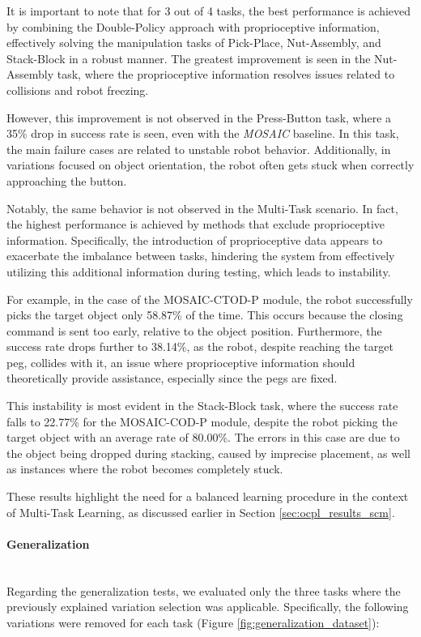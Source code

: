 It is important to note that for 3 out of 4 tasks, the best performance is achieved by combining the Double-Policy approach with proprioceptive information, effectively solving the manipulation tasks of Pick-Place, Nut-Assembly, and Stack-Block in a robust manner. The greatest improvement is seen in the Nut-Assembly task, where the proprioceptive information resolves issues related to collisions and robot freezing.

However, this improvement is not observed in the Press-Button task, where a 35\% drop in success rate is seen, even with the \textit{MOSAIC} baseline. In this task, the main failure cases are related to unstable robot behavior. Additionally, in variations focused on object orientation, the robot often gets stuck when correctly approaching the button.

Notably, the same behavior is not observed in the Multi-Task scenario. In fact, the highest performance is achieved by methods that exclude proprioceptive information. Specifically, the introduction of proprioceptive data appears to exacerbate the imbalance between tasks, hindering the system from effectively utilizing this additional information during testing, which leads to instability. 

For example, in the case of the MOSAIC-CTOD-P module, the robot successfully picks the target object only 58.87\% of the time. This occurs because the closing command is sent too early, relative to the object position. Furthermore, the success rate drops further to 38.14\%, as the robot, despite reaching the target peg, collides with it, an issue where proprioceptive information should theoretically provide assistance, especially since the pegs are fixed.

This instability is most evident in the Stack-Block task, where the success rate falls to 22.77\% for the MOSAIC-COD-P module, despite the robot picking the target object with an average rate of 80.00\%. The errors in this case are due to the object being dropped during stacking, caused by imprecise placement, as well as instances where the robot becomes completely stuck.

These results highlight the need for a balanced learning procedure in the context of Multi-Task Learning, as discussed earlier in Section \ref{sec:ocpl_results_scm}.


\paragraph*{Generalization}\mbox{}\\
Regarding the generalization tests, we evaluated only the three tasks where the previously explained variation selection was applicable. Specifically, the following variations were removed for each task (Figure \ref{fig:generalization_dataset}):

